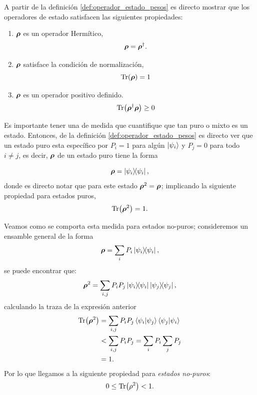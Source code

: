 \documentclass[../Main.tex]{subfiles}
\begin{document}
A partir de la definición \eqref{def:operador_estado_pesos} es directo mostrar que los operadores de estado satisfacen las siguientes propiedades:
\begin{enumerate}
    \item $\bm{\rho}$ es un operador Hermítico,
        \begin{equation}
            \bm{\rho} = \bm{\rho}^\dagger.
        \end{equation}
    \item $\bm{\rho}$ satisface la condición de normalización,
        \begin{equation}
            \Tr(\bm{\rho})=1
            \label{def:condicion_normalizacion}
            \end{equation}
    \item $\bm{\rho}$ es un operador positivo definido.
        \begin{equation}
            \Tr(\bm{\rho}^\dagger\bm{\rho})\geq0
        \end{equation}
\end{enumerate}

Es importante tener una de medida que cuantifique que tan puro o mixto es un estado. Entonces, de la definición \eqref{def:operador_estado_pesos} es directo ver que un estado puro esta específico por $P_i=1$ para algún $\ket{\psi_i}$ y $P_j=0$ para todo $i\neq j$, es decir, $\bm{\rho}$ de un estado puro tiene la forma

\begin{equation}
    \bm{\rho} = \op{\psi_i},
\end{equation}
donde es directo notar que para este estado $\bm{\rho}^2=\bm{\rho}$; implicando la siguiente propiedad para estados puros,
\begin{equation}
    \Tr(\bm{\rho}^2)=1.
\end{equation}

Veamos como se comporta esta medida para estados no-puros; consideremos un ensamble general de la forma
\begin{equation}
    \bm{\rho}=\sum_i P_i \op{\psi_i},
    \label{def:estado_no-puro}
\end{equation}
se puede encontrar que:
\begin{equation}
    \bm{\rho}^2=\sum_{i,j}P_iP_j\op{\psi_i}\op{\psi_j},
    \label{eq:rho2_general}
\end{equation}
calculando la traza de la expresión anterior
\begin{align}
    \Tr(\rhon^2)&=
    \sum_{i,j}P_iP_j\ip{\psi_i}{\psi_j}\ip{\psi_j}{\psi_i}\notag\\
    &<\sum_{i,j}P_iP_j=\sum_iP_i\sum_jP_j\notag\\
    &=1.
    \label{eq:calculo_traza}
\end{align}
Por lo que llegamos a la siguiente propiedad para \emph{estados no-puros}:
\begin{equation}
    0\le\Tr(\rho^2)<1.
    \label{eq:traza_no_puro}
\end{equation}
\end{document}

